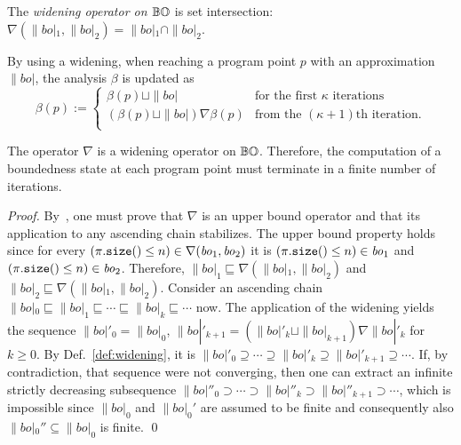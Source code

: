 \begin{definition}\label{def:widening}
  The \emph{widening operator on ${\mathbb{BO}}$} is set intersection:
  $\nabla(\|bo|_1,\|bo|_2)=\|bo|_1\cap\|bo|_2$.
\end{definition}
%
By using a widening, when reaching a program point $p$ with an approximation $\|bo|$,
the analysis $\beta$ is updated as
\[
\beta(p):=\begin{cases}
\beta(p)\sqcup\|bo| & \text{for the first $\kappa$ iterations}\\
(\beta(p)\sqcup\|bo|)\nabla\beta(p) & \text{from the $(\kappa+1)$th iteration.}\\
\end{cases}
\]
%
\begin{proposition}[Termination]\label{prop:termination}
  The operator $\nabla$ is a widening operator on ${\mathbb{BO}}$.
  Therefore, the computation
  of a boundedness state at each program point must terminate in
  a finite number of iterations.
\end{proposition}
\begin{proof}
  By~\cite{CousotC77}, one must prove that $\nabla$ is an upper bound operator and that
  its application to any ascending chain stabilizes. The upper bound property holds since
  for every $(\size{\pi}\le n)\in\nabla(\|bo|_1,\|bo|_2)$ it is
  $(\size{\pi}\le n)\in\|bo|_1$ and $(\size{\pi}\le n)\in\|bo|_2$.
  Therefore, $\|bo|_1\sqsubseteq\nabla(\|bo|_1,\|bo|_2)$ and
  $\|bo|_2\sqsubseteq\nabla(\|bo|_1,\|bo|_2)$.
  Consider an ascending chain $\|bo|_0\sqsubseteq\|bo|_1\sqsubseteq\cdots\sqsubseteq
  \|bo|_k\sqsubseteq\cdots$ now. The application of the widening yields the sequence
  $\|bo|'_0=\|bo|_0$, $\|bo|'_{k+1}=(\|bo|'_k\sqcup\|bo|_{k+1})\nabla\|bo|'_k$ for $k\ge 0$.
  By Def.~\ref{def:widening}, it is
  $\|bo|'_0\supseteq\cdots\supseteq\|bo|'_{k}\supseteq\|bo|'_{k+1}\supseteq\cdots$.
  If, by contradiction, that sequence were not converging, then one can extract an
  infinite strictly decreasing subsequence
  $\|bo|''_0\supset\cdots\supset\|bo|''_{k}\supset\|bo|''_{k+1}\supset\cdots$, which is
  impossible since $\|bo|_0$ and $\|bo|_0'$ are assumed to be finite and
  consequently also $\|bo|_0''\subseteq\|bo|_0$ is finite.
  \qed
\end{proof}
